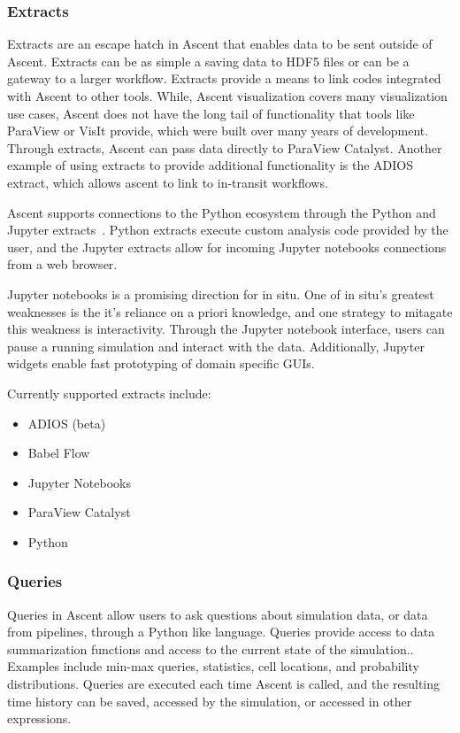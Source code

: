 \subsubsection{Extracts}
Extracts are an escape hatch in Ascent that enables data to be sent
outside of Ascent.
%
Extracts can be as simple a saving data to HDF5 files or can be a gateway
to a larger workflow.
Extracts provide a means to link codes integrated with Ascent to other tools.
%
While, Ascent visualization covers many visualization use cases,
Ascent does not have the long tail of functionality that tools like ParaView or VisIt provide, which
were built over many years of development.
%
Through extracts, Ascent can pass data directly to ParaView Catalyst.
%
Another example of using extracts to provide additional functionality is the
ADIOS extract, which allows ascent to link to in-transit workflows.

Ascent supports connections to the Python ecosystem through the Python and
Jupyter extracts~\cite{CyrusISAV}.
%
Python extracts execute custom analysis code provided by the user, and the
Jupyter extracts allow for incoming Jupyter notebooks connections from a web
browser.

Jupyter notebooks is a promising direction for in situ.
%
One of in situ's greatest weaknesses is the it's reliance on a priori
knowledge, and one strategy to mitagate this weakness is interactivity.
%
Through the Jupyter notebook interface, users can pause a running simulation
and interact with the data.
%
Additionally, Jupyter widgets enable fast prototyping of domain specific
GUIs.


Currently supported extracts include:
\begin{itemize}
\item ADIOS (beta)
\item Babel Flow
\item Jupyter Notebooks
\item ParaView Catalyst
\item Python
\end{itemize}

\subsubsection{Queries}
\label{action_queries}
Queries in Ascent allow users to ask questions about simulation data,
or data from pipelines, through a Python like language.
%
Queries provide access to data summarization functions and access to the
current state of the simulation..
%
Examples include min-max queries, statistics, cell locations,
and probability distributions.
%
Queries are executed each time Ascent is called, and the resulting time
history can be saved, accessed by the simulation, or accessed in other
expressions.

